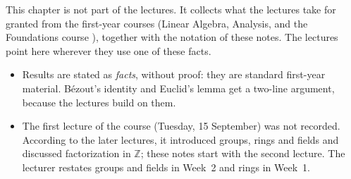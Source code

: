 


\begin{overview}
This chapter is not part of the lectures. It collects what the lectures take for granted from the first-year courses (Linear Algebra, Analysis, and the Foundations course ), together with the notation of these notes. The lectures point here wherever they use one of these facts.
\begin{itemize}
    \item Results are stated as \emph{facts}, without proof: they are standard first-year material. Bézout's identity and Euclid's lemma get a two-line argument, because the lectures build on them.
    \item The first lecture of the course (Tuesday, 15 September) was not recorded. According to the later lectures, it introduced groups, rings and fields and discussed factorization in $\mathbb{Z}$; these notes start with the second lecture. The lecturer restates groups and fields in Week~2 and rings in Week~1.
\end{itemize}
\end{overview}

